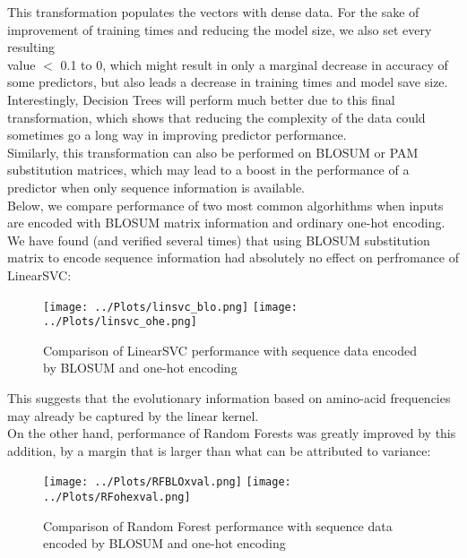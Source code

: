 \documentclass[12pt]{article}
\begin{document}
\noindent This transformation populates the vectors with dense data. For the sake of improvement of training times and  reducing the model size, we also set every resulting\\ value $ < $ 0.1 to 0, which might result in only a marginal decrease in accuracy of some predictors, but also leads a decrease in training times and model save size. Interestingly, Decision Trees will  perform much better due to this final transformation, which shows that reducing the complexity of the data could sometimes go a long way in improving predictor performance. \\
Similarly, this transformation can also be performed on BLOSUM or PAM substitution matrices, which may lead to a boost in the  performance of a predictor when only sequence information is available.\\
Below, we compare performance of two most common algorhithms when inputs are encoded with BLOSUM matrix information and ordinary one-hot encoding.
\newpage
\noindent We have found (and verified several times) that using BLOSUM substitution matrix to encode sequence information had absolutely no effect on perfromance of LinearSVC:

\begin{figure}[H]
\hspace*{-0.5in}
\texttt{[image: ../Plots/linsvc\_blo.png]}
\hspace*{-0.75in} 
\texttt{[image: ../Plots/linsvc\_ohe.png]}
\caption{Comparison of LinearSVC performance with sequence data encoded by BLOSUM and one-hot encoding}
\end{figure} 


\noindent This suggests that the evolutionary information based on amino-acid frequencies may already be captured by the linear kernel. \\
\noindent On the other hand, performance of Random Forests was greatly improved by this addition, by a margin that is larger than what can be attributed to variance:

\begin{figure}[H]
\hspace*{-0.5in}
\texttt{[image: ../Plots/RFBLOxval.png]} 
\hspace*{-0.75in}
\texttt{[image: ../Plots/RFohexval.png]} 
\caption{Comparison of Random Forest performance with sequence data encoded by BLOSUM and one-hot encoding}
\end{figure}
\newpage
\end{document}
